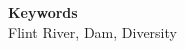 \documentclass[a4paper, 12pt]{article} %
\def\keywords#1{\begin{center}{\bf Keywords}\\{#1}\end{center}} %
\begin{document}
\keywords{Flint River, Dam, Diversity} %






\end{document}
